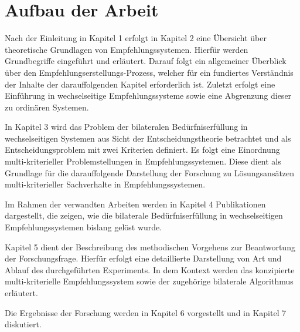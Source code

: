 \section{Aufbau der Arbeit}
\label{sec:einleitung:aufbau_der_arbeit}
Nach der Einleitung in Kapitel 1 erfolgt in Kapitel 2 eine Übersicht über theoretische Grundlagen von Empfehlungssystemen.
Hierfür werden Grundbegriffe eingeführt und erläutert.
Darauf folgt ein allgemeiner Überblick über den Empfehlungserstellungs-Prozess, welcher für ein fundiertes Verständnis der Inhalte der darauffolgenden Kapitel erforderlich ist.
Zuletzt erfolgt eine Einführung in wechselseitige Empfehlungssysteme sowie eine Abgrenzung dieser zu ordinären Systemen.

In Kapitel 3 wird das Problem der bilateralen Bedürfniserfüllung in wechselseitigen Systemen aus Sicht der Entscheidungstheorie betrachtet und als Entscheidungsproblem mit zwei Kriterien definiert.
Es folgt eine Einordnung multi-kriterieller Problemstellungen in Empfehlungssystemen.
Diese dient als Grundlage für die darauffolgende Darstellung der Forschung zu Lösungsansätzen multi-kriterieller Sachverhalte in Empfehlungssystemen.

Im Rahmen der verwandten Arbeiten werden in Kapitel 4 Publikationen dargestellt, die zeigen, wie die bilaterale Bedürfniserfüllung in wechselseitigen Empfehlungssystemen bislang gelöst wurde.

Kapitel 5 dient der Beschreibung des methodischen Vorgehens zur Beantwortung der Forschungsfrage.
Hierfür erfolgt eine detaillierte Darstellung von Art und Ablauf des durchgeführten Experiments.
In dem Kontext werden das konzipierte multi-kriterielle Empfehlungssystem sowie der zugehörige bilaterale Algorithmus erläutert.

Die Ergebnisse der Forschung werden in Kapitel 6 vorgestellt und in Kapitel 7 diskutiert.

